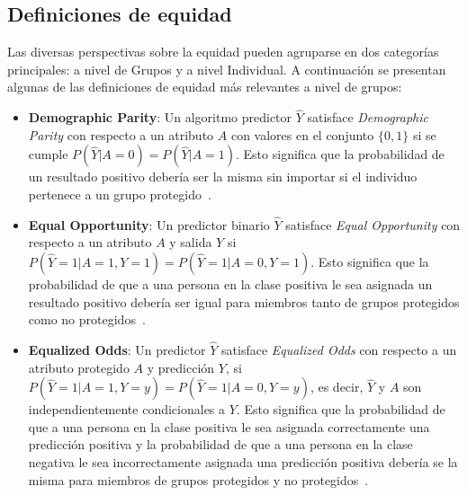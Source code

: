 \subsection{Definiciones de equidad}
Las diversas perspectivas sobre la equidad pueden agruparse en dos categor\'ias principales: a nivel de Grupos y a nivel Individual. 
A continuaci\'on se presentan algunas de las definiciones de equidad m\'as relevantes a nivel de grupos:

\begin{itemize}
    \item \textbf{Demographic Parity}: Un algoritmo predictor $\hat{Y}$ satisface \emph{Demographic Parity}
    con respecto a un atributo $A$ con valores en el conjunto $\{0,1\}$ si se cumple $P(\hat{Y} | A = 0) = P(\hat{Y} | A = 1)$. 
    Esto significa que la probabilidad de un resultado positivo debería ser la misma sin importar si el individuo pertenece a
    un grupo protegido~\parencite{fairness_def}.

    \item \textbf{Equal Opportunity}: Un predictor binario $\hat{Y}$ satisface \emph{Equal Opportunity} con 
    respecto a un atributo $A$ y salida $Y$ si $P(\hat{Y} = 1 | A = 1, Y = 1) = P(\hat{Y} = 1 | A = 0, Y = 1)$. Esto significa
    que la probabilidad de que a una persona en la clase positiva le sea asignada un resultado positivo 
    deber\'ia ser igual para miembros tanto de grupos protegidos como no protegidos~\parencite{fairness_def}.

    \item \textbf{Equalized Odds}: Un predictor $\hat{Y}$ satisface \emph{Equalized Odds} con respecto a un atributo
    protegido $A$ y predicci\'on $Y$, si $P(\hat{Y} = 1 | A = 1, Y = y) = P(\hat{Y} = 1 | A = 0, Y = y)$, es decir,
    $\hat{Y}$ y $A$ son independientemente condicionales a $Y$. Esto significa que la probabilidad de que a una persona 
    en la clase positiva le sea asignada correctamente una predicci\'on positiva y la probabilidad de que a una persona en la 
    clase negativa le sea incorrectamente asignada una predicci\'on positiva deber\'ia se la misma para miembros de grupos 
    protegidos y no protegidos~\parencite{fairness_def}.
\end{itemize}




